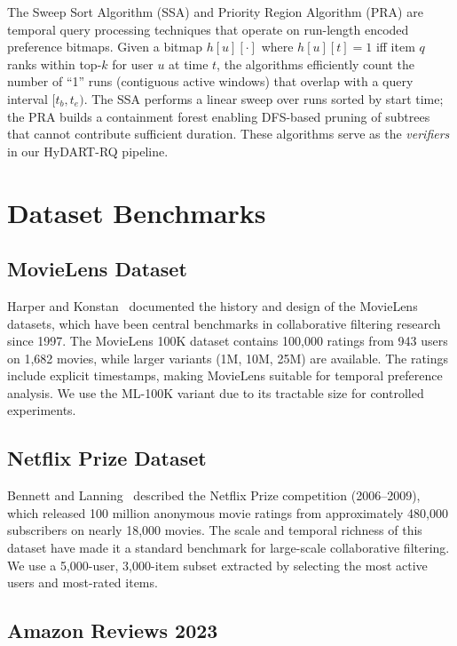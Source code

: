 The Sweep Sort Algorithm (SSA) \cite{mouratidis2006continuous} and Priority Region Algorithm (PRA) are temporal query processing techniques that operate on run-length encoded preference bitmaps. Given a bitmap $h[u][\cdot]$ where $h[u][t] = 1$ iff item $q$ ranks within top-$k$ for user $u$ at time $t$, the algorithms efficiently count the number of ``1'' runs (contiguous active windows) that overlap with a query interval $[t_b, t_e)$. The SSA performs a linear sweep over runs sorted by start time; the PRA builds a containment forest enabling DFS-based pruning of subtrees that cannot contribute sufficient duration. These algorithms serve as the \textit{verifiers} in our HyDART-RQ pipeline.

\section{Dataset Benchmarks}

\subsection{MovieLens Dataset}

Harper and Konstan~\cite{harper2016movielens} documented the history and design of the MovieLens datasets, which have been central benchmarks in collaborative filtering research since 1997. The MovieLens 100K dataset contains 100{,}000 ratings from 943 users on 1{,}682 movies, while larger variants (1M, 10M, 25M) are available. The ratings include explicit timestamps, making MovieLens suitable for temporal preference analysis. We use the ML-100K variant due to its tractable size for controlled experiments.

\subsection{Netflix Prize Dataset}

Bennett and Lanning~\cite{bennett2007netflix} described the Netflix Prize competition (2006--2009), which released 100 million anonymous movie ratings from approximately 480{,}000 subscribers on nearly 18{,}000 movies. The scale and temporal richness of this dataset have made it a standard benchmark for large-scale collaborative filtering. We use a 5{,}000-user, 3{,}000-item subset extracted by selecting the most active users and most-rated items.

\subsection{Amazon Reviews 2023}

